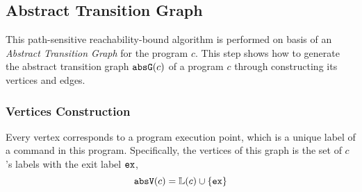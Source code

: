   

\subsection{Abstract Transition Graph}
\label{sec:abscfg}

This path-sensitive reachability-bound algorithm
is performed on basis of an \emph{Abstract Transition Graph} for the program $c$.
This step shows how to generate the abstract transition graph $\mathtt{abs}{\mathtt{G}}(c)$ of a
program $c$ through constructing its vertices and edges.

\subsubsection{Vertices Construction}
\label{sec:abscfg-vertex}
Every 
vertex corresponds to a program execution point, which is a unique
label of a command in this program.
Specifically,
the vertices of this graph is the set of $c$'s labels with the exit label ${\mathtt{ex}}$, 
\[ 
  \mathtt{abs}{\mathtt{V}}(c) = \mathbb{L}(c)\cup\{{\mathtt{ex}}\}
  \]

